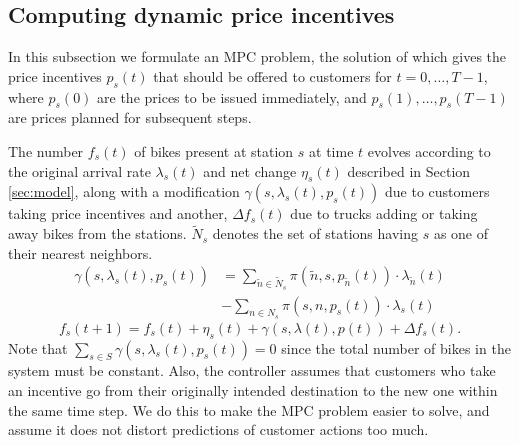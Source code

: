 \documentclass{article}
\begin{document}
\subsection{Computing dynamic price incentives}
\label{sec:mpc}
In this subsection we formulate an MPC problem, the solution of which gives the
price incentives $p_s(t)$ that should be offered to customers for
$t=0,\ldots,T-1$, where $p_s(0)$ are the prices to be issued immediately, and
$p_s(1),\ldots,p_s(T-1)$ are prices planned for subsequent steps.

The number $f_{s}(t)$ of bikes present at station $s$ at time $t$ evolves
according to the original arrival rate $\lambda_s(t)$ and net change $\eta_s(t)$
described in Section \ref{sec:model}, along with a modification
$\gamma(s,\lambda_s(t), p_s(t))$ due to customers taking price incentives and
another, $\Delta f_s(t)$ due to trucks adding or taking away bikes from the
stations. $\tilde N_s$ denotes the set of stations having $s$ as one of their
nearest neighbors.
\begin{equation}
\begin{aligned}
  \gamma(s,\lambda_s(t),p_s(t)) &= \sum_{\tilde n\in \tilde N_s} \pi\left(\tilde n,s,p_{\tilde n}(t)\right) \cdot \lambda_{\tilde n}(t)\\
&- \sum_{n\in N_s} \pi\left(s,n,p_s(t)\right) \cdot \lambda_s(t)
  \end{aligned}
\end{equation}
\begin{equation}
  f_s(t+1) = f_s(t) + \eta_s(t) + \gamma\left(s,\lambda(t), p(t)\right) + \Delta f_s(t).
  \label{eq:lin-model}
\end{equation}
Note that $\sum_{s\in S} \gamma(s,\lambda_s(t), p_s(t))= 0$ since the total number of bikes in
the system must be constant. Also, the controller assumes that customers who
take an incentive go from their originally intended destination to the new one
within the same time step. We do this to make the MPC problem easier to solve,
and assume it does not distort predictions of customer actions too much.
\end{document}
